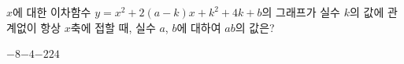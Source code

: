 $x$에 대한 이차함수 $y=x^2+2(a-k)x+k^2+4k+b$의 그래프가 실수 $k$의 값에 관계없이 항상 $x$축에 접할 때, 실수 $a$, $b$에 대하여 $ab$의 값은?
\begin{choices32}{$-8$}{$-4$}{$-2$}{$2$}{$4$}\end{choices32}
